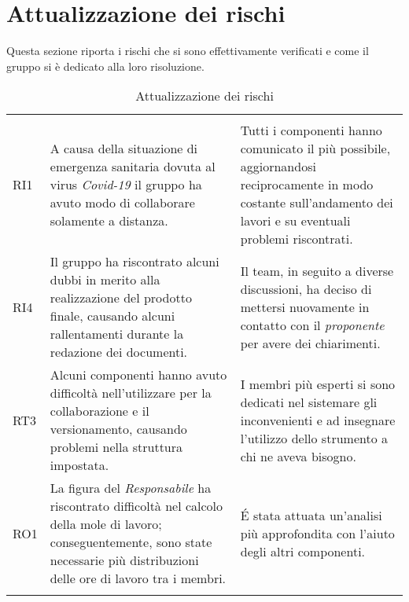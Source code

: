 \section{Attualizzazione dei rischi}

Questa sezione riporta i rischi che si sono effettivamente verificati e come il gruppo si è dedicato alla loro risoluzione.

\begin{longtable}{C{2.5cm} C{7cm} C{7cm}} 
 	 &
 	 &
 	 \\
 	
 	RI1 & A causa della situazione di emergenza sanitaria dovuta al virus \textit{Covid-19} il gruppo ha avuto modo di collaborare solamente a distanza. & Tutti i componenti hanno comunicato il più possibile, aggiornandosi reciprocamente in modo costante sull'andamento dei lavori e su eventuali problemi riscontrati. \\
 	RI4 & Il gruppo ha riscontrato alcuni dubbi in merito alla realizzazione del prodotto finale, causando alcuni rallentamenti durante la redazione dei documenti. & Il team, in seguito a diverse discussioni, ha deciso di mettersi nuovamente in contatto con il \textit{proponente} per avere dei chiarimenti. \\
 	RT3 & Alcuni componenti hanno avuto difficoltà nell'utilizzare  per la collaborazione e il versionamento, causando problemi nella struttura impostata. & I membri più esperti si sono dedicati nel sistemare gli inconvenienti e ad insegnare l'utilizzo dello strumento a chi ne aveva bisogno. \\
 	RO1 & La figura del \textit{Responsabile} ha riscontrato difficoltà nel calcolo della mole di lavoro; conseguentemente, sono state necessarie più distribuzioni delle ore di lavoro tra i membri. & \'E stata attuata un'analisi più approfondita con l'aiuto degli altri componenti. \\
 	\caption{Attualizzazione dei rischi}
\end{longtable}